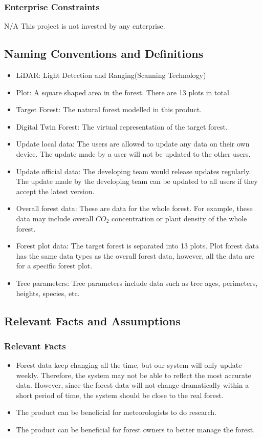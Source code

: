 \documentclass{article}
\begin{document}
\subsubsection{Enterprise Constraints}
N/A This project is not invested by any enterprise.
\subsection{Naming Conventions and Definitions}
\begin{itemize}
    \item LiDAR: Light Detection and Ranging(Scanning Technology)
    \item Plot: A square shaped area in the forest. There are 13 plots in total. 
    \item Target Forest: The natural forest modelled in this product.
    \item Digital Twin Forest: The virtual representation of the target forest.
    \item Update local data: The users are allowed to update any data on their own device. The update made by a user will not be updated to the other users.
    \item Update official data: The developing team would release updates regularly. The update made by the developing team can be updated to all users if they accept the latest version.
    \item Overall forest data: These are data for the whole forest. For example,
    these data may include overall $CO_2$ concentration or plant density of the whole
    forest.
    \item Forest plot data: The target forest is separated into 13 plots. Plot forest
    data
    has the same data types as the overall forest data, however, all the data are for
    a specific forest plot.
    \item Tree parameters: Tree parameters include data such as tree ages,
    perimeters,
    heights, species, etc.
\end{itemize}

\subsection{Relevant Facts and Assumptions}
\subsubsection{Relevant Facts}
\begin{itemize}
    \item Forest data keep changing all the time, but our 
    system will only update weekly. Therefore, the 
    system may not be able to reflect the most accurate data. 
    However, since the forest data will not change dramatically
    within a short period of time, the system should be 
    close to the real forest.
    \item The product can be beneficial for meteorologists to do research.
    \item The product can be beneficial for forest owners 
    to better manage the forest.
\end{itemize}
\end{document}
